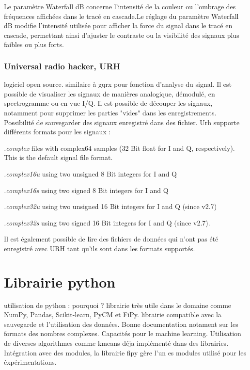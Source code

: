 Le paramètre Waterfall dB concerne l'intensité de la couleur ou l'ombrage des fréquences affichées dans le tracé en cascade.Le réglage du paramètre Waterfall dB modifie l'intensité utilisée pour afficher la force du signal dans le tracé en cascade, permettant ainsi d'ajuster le contraste ou la visibilité des signaux plus faibles ou plus forts.


\subsubsection{Universal radio hacker, URH}

logiciel open source. similaire à gqrx pour fonction d'analyse du signal. Il est possible de visualiser les signaux de manières analogique, démodulé, en spectrogramme ou en vue I/Q. Il est possible de découper les signaux, notamment pour supprimer les parties "vides" dans les enregistrements. Possibilité de sauvegarder des signaux enregistré dans des fichier. Urh supporte différents formats pour les signaux :

 \textit{.complex} files with complex64 samples (32 Bit float for I and Q, respectively). This is the default signal file format.
 
\textit{.complex16u} using two unsigned 8 Bit integers for I and Q

\textit{.complex16s} using two signed 8 Bit integers for I and Q

\textit{.complex32u} using two unsigned 16 Bit integers for I and Q (since v2.7)

\textit{.complex32s} using two signed 16 Bit integers for I and Q (since v2.7).

Il est également possible de lire des fichiers de données qui n'ont pas été enregistré avec URH tant qu'ils sont dans les formats supportés.

\section{Librairie python}

utilisation de python : pourquoi ?
librairie très utile dans le domaine comme NumPy, Pandas, Scikit-learn, PyCM et FiPy. librairie compatible avec la sauvegarde et l'utilisation des données. Bonne documentation notament sur les formats des nombres complexes.
Capacités pour le machine learning. Utilisation de diverses algorithmes comme kmeans déja implémenté dans des librairies.
Intégration avec des modules, la librairie fipy gère l'un es modules utilisé pour les éxpérimentations.

